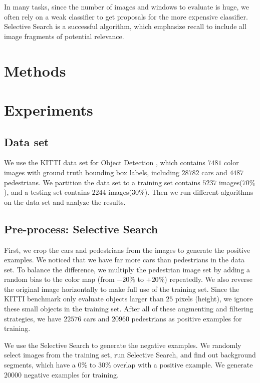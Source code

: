 \documentclass{article} %
\begin{document}
In many tasks, since the number of images and windows to evaluate is huge, we often rely on a weak classifier to get proposals for the more expensive classifier. Selective Search \cite{van2011segmentation} is a successful algorithm, which emphasize recall to include all image fragments of potential relevance. 

\section{Methods}

\section{Experiments}

\subsection{Data set}

We use the KITTI data set for Object Detection \cite{Geiger2012CVPR}, which contains $7481$ color images with ground truth bounding box labels, including $28782$ cars and $4487$ pedestrians. We partition the data set to a training set contains $5237$ images($70\%$), and a testing set contains $2244$ images($30\%$). Then we run different algorithms on the data set and analyze the results.

\subsection{Pre-process: Selective Search}
\label{sec:preprocess}

First, we crop the cars and pedestrians from the images to generate the positive examples. We noticed that we have far more cars than pedestrians in the data set. To balance the difference, we multiply the pedestrian image set by adding a random bias to the color map (from $-20\%$ to $+20\%$) repeatedly. We also reverse the original image horizontally to make full use of the training set. Since the KITTI benchmark only evaluate objects larger than $25$ pixels (height), we ignore these small objects in the training set. After all of these augmenting and filtering strategies, we have $22576$ cars and $20960$ pedestrians as positive examples for training.

We use the Selective Search \cite{van2011segmentation} to generate the negative examples. We randomly select images from the training set, run Selective Search, and find out background segments, which have a $0\%$ to $30\%$ overlap with a positive example. We generate $20000$ negative examples for training. 
\end{document}
